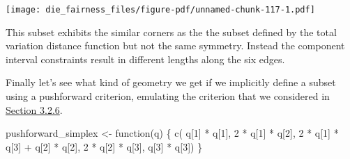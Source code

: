\documentclass[
  letterpaper,
  DIV=11,
  numbers=noendperiod]{scrartcl}
\newenvironment{Shaded}{\begin{snugshade}}{\end{snugshade}}
\newcommand{\ControlFlowTok}[1]{\textcolor[rgb]{0.00,0.23,0.31}{#1}}
\newcommand{\DecValTok}[1]{\textcolor[rgb]{0.68,0.00,0.00}{#1}}
\newcommand{\FunctionTok}[1]{\textcolor[rgb]{0.28,0.35,0.67}{#1}}
\newcommand{\NormalTok}[1]{\textcolor[rgb]{0.00,0.23,0.31}{#1}}
\newcommand{\OtherTok}[1]{\textcolor[rgb]{0.00,0.23,0.31}{#1}}
\newcommand{\SpecialCharTok}[1]{\textcolor[rgb]{0.37,0.37,0.37}{#1}}
\begin{document}
\texttt{[image: die\_fairness\_files/figure-pdf/unnamed-chunk-117-1.pdf]}

This subset exhibits the similar corners as the the subset defined by
the total variation distance function but not the same symmetry. Instead
the component interval constraints result in different lengths along the
six edges.

Finally let's see what kind of geometry we get if we implicitly define a
subset using a pushforward criterion, emulating the criterion that we
considered in \hyperref[sec:effective_pushforward]{Section 3.2.6}.

\begin{Shaded}
\begin{Highlighting}[]
\NormalTok{pushforward\_simplex }\OtherTok{\textless{}{-}} \ControlFlowTok{function}\NormalTok{(q) \{}
  \FunctionTok{c}\NormalTok{(    q[}\DecValTok{1}\NormalTok{] }\SpecialCharTok{*}\NormalTok{ q[}\DecValTok{1}\NormalTok{],}
    \DecValTok{2} \SpecialCharTok{*}\NormalTok{ q[}\DecValTok{1}\NormalTok{] }\SpecialCharTok{*}\NormalTok{ q[}\DecValTok{2}\NormalTok{],}
    \DecValTok{2} \SpecialCharTok{*}\NormalTok{ q[}\DecValTok{1}\NormalTok{] }\SpecialCharTok{*}\NormalTok{ q[}\DecValTok{3}\NormalTok{] }\SpecialCharTok{+}\NormalTok{ q[}\DecValTok{2}\NormalTok{] }\SpecialCharTok{*}\NormalTok{ q[}\DecValTok{2}\NormalTok{],}
    \DecValTok{2} \SpecialCharTok{*}\NormalTok{ q[}\DecValTok{2}\NormalTok{] }\SpecialCharTok{*}\NormalTok{ q[}\DecValTok{3}\NormalTok{],}
\NormalTok{        q[}\DecValTok{3}\NormalTok{] }\SpecialCharTok{*}\NormalTok{ q[}\DecValTok{3}\NormalTok{])}
\NormalTok{\}}
\end{Highlighting}
\end{Shaded}
\end{document}
